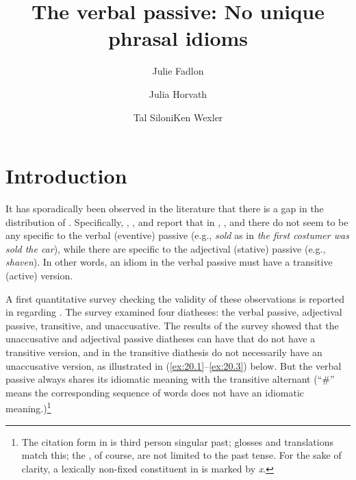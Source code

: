 \documentclass[output=paper]{langsci/langscibook}
\author{Julie Fadlon\affiliation{Tel Aviv University}\and Julia Horvath\affiliation{Tel Aviv University}\and Tal Siloni\affiliation{Tel Aviv University}\lastand Ken Wexler\affiliation{Massachusetts Institute of Technology}}
\title{The verbal passive: No unique phrasal idioms}
\begin{document}
\glsresetall
\maketitle\newpage

\section{Introduction}

It has sporadically been observed in the literature that there is a gap in the
distribution of . Specifically, \citet{DubSim1996}, \citet{Marantz1997},
and \textcite{Ruwet1991} report that in , , and
 there do not seem to be any  specific to
the verbal (eventive) passive (e.g., \emph{sold} as in \textit{the first costumer was
sold the car}), while there are  specific to the adjectival (stative)
passive (e.g., \emph{shaven}). In other words, an idiom in the verbal passive
must have a transitive (active) version.

A first quantitative survey checking the validity of these observations is
reported in \citet{HorSil2009} regarding . The survey examined four
diatheses: the verbal passive, adjectival passive, transitive, and
unaccusative. The results of the survey showed that the unaccusative and
adjectival passive diatheses can have  that do not have a transitive
version, and  in the transitive diathesis do not necessarily have an
unaccusative version, as illustrated in (\ref{ex:20.1}--\ref{ex:20.3}) below. But the verbal passive
always shares its idiomatic meaning with the transitive alternant (``\#'' means the
corresponding sequence of words does not have an idiomatic
meaning.)\footnote{The citation form in  is third person singular
    past; glosses and translations match this; the , of course, are not
    limited to the past tense. For the sake of clarity, a lexically non-fixed
    constituent in   is marked by \emph{x}.}\largerpage[2]
\end{document}

